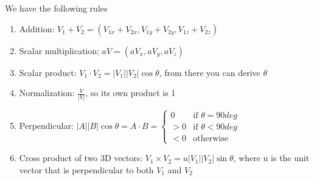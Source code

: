 \documentclass[11pt]{article}
\begin{document}
We have the following rules
\begin{enumerate}
    \item Addition: $V_1 + V_2 = (V_{1x} + V_{2x}, V_{1y} + V_{2y}, V_{1z} + V_{2z})$
    \item Scalar multiplication: $aV = (aV_x, aV_y, aV_z)$
    \item Scalar product: $V_1 \cdot V_2 = |V_1||V_2|\cos \theta$, from there you can derive $\theta$    
    \item Normalization: $\frac{V}{|V|}$, so its own product is 1
    \item Perpendicular: $|A||B|\cos \theta = A \cdot B =
     \begin{cases}
        0 & \text{if } \theta = 90 deg\\
        > 0 & \text{if }\theta < 90 deg\\
        < 0 & \text{otherwise}
    \end{cases}$  
    \item Cross product of two 3D vectors: $V_1 \times V_2 = u |V_1||V_2|\sin \theta$, where u is the unit vector that is perpendicular to both $V_1$ and $V_2$ %
\end{enumerate}
\end{document}
